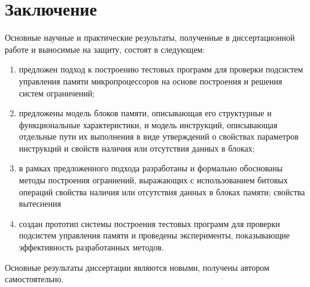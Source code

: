 \chapter*{Заключение}

Основные научные и практические результаты, полученные в
диссертационной работе и выносимые на защиту, состоят в следующем:

\begin{enumerate}
    \item предложен подход к построению тестовых программ для проверки подсистем управления памяти микропроцессоров на основе построения и решения систем ограничений;
        
    \item предложены модель блоков памяти, описывающая его структурные и функциональные характеристики, и модель инструкций, описывающая отдельные пути их выполнения в виде утверждений о свойствах параметров инструкций и свойств наличия или отсутствия данных в блоках;

    \item в рамках предложенного подхода разработаны и формально обоснованы методы построения ограниений, выражающих с использованием битовых операций свойства наличия или отсутствия данных в блоках памяти; свойства вытеснения

    \item создан прототип системы построения тестовых программ для проверки подсистем управления памяти и проведены эксперименты, показывающие эффективность разработанных методов.
\end{enumerate}

Основные результаты диссертации являются новыми, получены автором самостоятельно.

